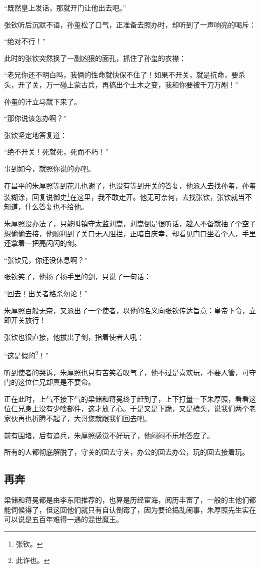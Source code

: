 \begin{multicols}{\theparacolNo}
“既然皇上发话，那就开门让他出去吧。”

张钦听后沉默不语，孙玺松了口气，正准备去照办时，却听到了一声响亮的喝斥：

“绝对不行！”

此时的张钦突然换了一副凶狠的面孔，抓住了孙玺的衣襟：

“老兄你还不明白吗，我俩的性命就快保不住了！如果不开关，就是抗命，要杀头，开了关，万一碰上蒙古兵，再搞出个土木之变，我和你要被千刀万剐！”

孙玺的汗立马就下来了。

“那你说该怎办啊？”

张钦坚定地答复道：

“绝不开关！死就死，死而不朽！”

事到如今，就照你说的办吧。

在昌平的朱厚照等到花儿也谢了，也没有等到开关的答复，他派人去找孙玺，孙玺装糊涂，回复说御史\footnote{张钦。}在这里，我不敢走开。他无可奈何，去找张钦，张钦就当不知道，什么答复也不给他。

朱厚照没办法了，只能叫镇守太监刘嵩，刘嵩倒是很听话，趁人不备就抽了个空子想偷偷去接，他顺利到了关口无人阻拦，正暗自庆幸，却看见门口坐着个人，手里还拿着一把亮闪闪的剑。

“张钦兄，你还没休息啊？”

张钦笑了，他扬了扬手里的剑，只说了一句话：

“回去！出关者格杀勿论！”

朱厚照百般无奈，又派出了一个使者，以他的名义向张钦传达旨意：皇帝下令，立即开关放行！

张钦也很直接，他拔出了剑，指着使者大吼：

“这是假的\footnote{此诈也。}！”

听到使者的哭诉，朱厚照也只有苦笑着叹气了，他不过是喜欢玩，不要人管，可守门的这位仁兄却真是不要命。

正在此时，上气不接下气的梁储和蒋冕终于赶到了，上下打量一下朱厚照，看看这位仁兄身上没有少啥部件，这才放了心。于是又是下跪，又是磕头，说我们两个老家伙再也折腾不起了，大哥您就跟我们回去吧。

前有围堵，后有追兵，朱厚照感觉不好玩了，他闷闷不乐地答应了。

所有的人都彻底解脱了，守关的回去守关，办公的回去办公，玩的回去接着玩。

\subsection{再奔}
梁储和蒋冕都是由李东阳推荐的，也算是历经宦海，阅历丰富了，一般的主他们都能伺候得了，但这回他们就只有自认倒霉了，因为要论捣乱闹事，朱厚照先生实在可以说是五百年难得一遇的混世魔王。


\end{multicols}

